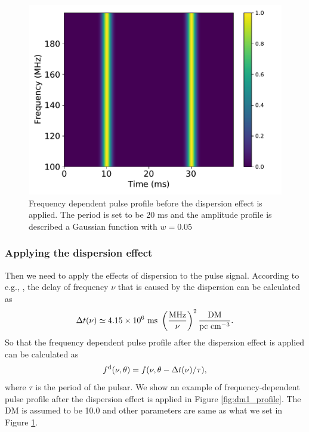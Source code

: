 \documentclass[fleqn,usenatbib]{mnras}
\begin{document}
\begin{figure}
    \centering
    \includegraphics[width=0.9\columnwidth]{dm0_profile.pdf}
    \caption{Frequency dependent pulse profile before the dispersion effect is applied. 
    The period is set to be 20 ms and the amplitude profile is described a Gaussian function with $w=0.05$}
    \label{fig:dm0_profile}
 \end{figure}
 
 \subsubsection{Applying the dispersion effect}
 
 Then we need to apply the effects of dispersion to the pulse signal. According to e.g., \citet{2012hpa..book.....L}, the delay of frequency $\nu$ that is caused by the dispersion can be calculated as 
 \begin{gather}
     \Delta t(\nu)\simeq 4.15\times 10^6~{\rm ms}~\left(\frac{{\rm MHz}}{\nu}\right)^2\frac{\rm DM}{\rm pc~cm^{-3}}.
 \end{gather}
 So that the frequency dependent pulse profile after the dispersion effect is applied can be calculated as
 \begin{gather}
     f^{\rm d}(\nu, \theta)=f(\nu, \theta-\Delta t(\nu)/\tau),
 \end{gather}
where $\tau$ is the period of the pulsar. 
We show an example of frequency-dependent pulse profile after the dispersion effect is applied in Figure \ref{fig:dm1_profile}. The DM is assumed to be 10.0 and other parameters are same as what we set in Figure \ref{fig:dm0_profile}.
\end{document}
